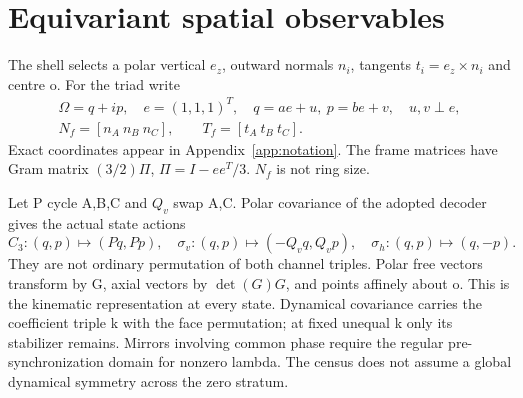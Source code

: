 \section{Equivariant spatial observables}\label{sec:observables}
The shell selects a polar vertical \(e_z\), outward normals \(n_i\), tangents \(t_i=e_z\times n_i\) and centre o. For the triad write
\begin{gather*}
\Omega=q+ip,\quad e=(1,1,1)^T,\quad
q=ae+u,\ p=be+v,\quad u,v\perp e,\\
N_f=[n_A\ n_B\ n_C],\qquad T_f=[t_A\ t_B\ t_C].
\end{gather*}
Exact coordinates appear in Appendix~\ref{app:notation}. The frame matrices have Gram matrix \((3/2)\Pi\), \(\Pi=I-ee^T/3\). \(N_f\) is not ring size.

Let P cycle A,B,C and \(Q_v\) swap A,C. Polar covariance of the adopted decoder gives the actual state actions
\begin{equation}
C_3:(q,p)\mapsto(Pq,Pp),\quad
\sigma_v:(q,p)\mapsto(-Q_vq,Q_vp),\quad
\sigma_h:(q,p)\mapsto(q,-p).\label{eq:reps}
\end{equation}
They are not ordinary permutation of both channel triples. Polar free vectors transform by G, axial vectors by \(\det(G)G\), and points affinely about o.
This is the kinematic representation at every state. Dynamical covariance carries the coefficient triple k with the face permutation; at fixed unequal k only its stabilizer remains. Mirrors involving common phase require the regular pre-synchronization domain for nonzero lambda. The census does not assume a global dynamical symmetry across the zero stratum.

